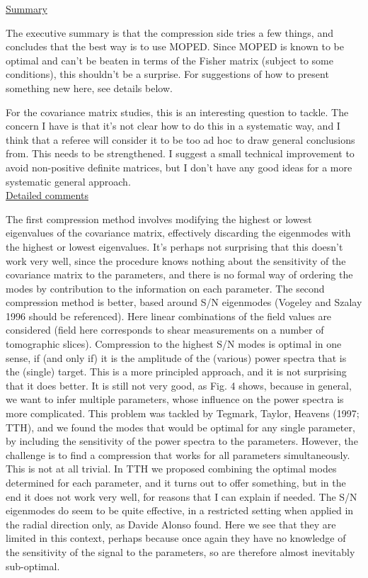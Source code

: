 \documentclass{article}
\begin{document}
	\underline{Summary}
	
    The executive summary is that the compression side tries a few things, and concludes that the best way is to use MOPED.  Since MOPED is known to be optimal and can’t be beaten in terms of the Fisher matrix (subject to some conditions), this shouldn’t be a surprise.  For suggestions of how to present something new here, see details below.
	
	For the covariance matrix studies, this is an interesting question to tackle.  The concern I have is that it’s not clear how to do this in a systematic way, and I think that a referee will consider it to be too ad hoc to draw general conclusions from.  This needs to be strengthened.  I suggest a small technical improvement to avoid non-positive definite matrices, but I don’t have any good ideas for a more systematic general approach. \\
	
	\underline{Detailed comments}
	
	The first compression method involves modifying the highest or lowest eigenvalues of the covariance matrix, effectively discarding the eigenmodes with the highest or lowest eigenvalues.  It’s perhaps not surprising that this doesn’t work very well, since the procedure knows nothing about the sensitivity of the covariance matrix to the parameters, and there is no formal way of ordering the modes by contribution to the information on each parameter. 
	The second compression method is better, based around S/N eigenmodes (Vogeley and Szalay 1996 should be referenced). Here linear combinations of the field values are considered (field here corresponds to shear measurements on a number of tomographic slices). Compression to the highest S/N modes is optimal in one sense, if (and only if) it is the amplitude of the (various) power spectra that is the (single) target.  This is a more principled approach, and it is not surprising that it does better.  It is still not very good, as Fig. 4 shows, because in general, we want to infer multiple parameters, whose influence on the power spectra is more complicated.  This problem was tackled by Tegmark, Taylor, Heavens (1997;  TTH), and we found the modes that would be optimal for any single parameter, by including the sensitivity of the power spectra to the parameters. However, the challenge is to find a compression that works for all parameters simultaneously.  This is not at all trivial. In TTH we proposed combining the optimal modes determined for each parameter, and it turns out to offer something, but in the end it does not work very well, for reasons that I can explain if needed.   The S/N eigenmodes do seem to be quite effective, in a restricted setting when applied in the radial direction only, as Davide Alonso found.  Here we see that they are limited in this context, perhaps because once again they have no knowledge of the sensitivity of the signal to the parameters, so are therefore almost inevitably sub-optimal.
	
\end{document}
